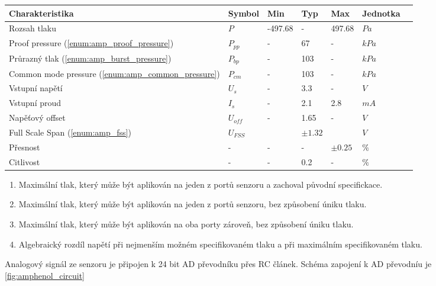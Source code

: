 \begin{center}
	\begin{tabular}{lllllll}
	\toprule
	Charakteristika                        & Symbol   & Min & Typ & Max   & Jednotka &  \\ \midrule
	Rozsah tlaku                           & $P$      &  -497.68  &   -   &  497.68  & $Pa$ & \\
	Proof pressure (\ref{enum:amp_proof_pressure})                      & $P_{pp}$ &  -  &   67   &  -  & $kPa$ & \\
	Průrazný tlak (\ref{enum:amp_burst_pressure})                       & $P_{bp}$ &  -  &   103   &  -  & $kPa$ & \\
	Common mode pressure (\ref{enum:amp_common_pressure})                & $P_{cm}$ &  -  &   103   &  -  & $kPa$ & \\
	Vstupní napětí                         & $U_{s}$  &  -  & 3.3  &  -  & $V$ &  \\
	Vstupní proud                          & $I_{s}$  &  -  & 2.1  &  2.8  & $mA$ &  \\
	Napěťový offset						   & $U_{off}$&  -  & 1.65 & -  & $V$ &  \\ 
	Full Scale Span (\ref{enum:amp_fss})                    & $U_{FSS}$&     &$\pm 1.32$& & $V$ & \\
	Přesnost							   & - 		  &  -  & - & $\pm 0.25 $  &  $\%$ &\\
	Citlivost                              & - & - & 0.2 & - & $\%$ & \\
	\bottomrule
\end{tabular}    
\end{center}
\raggedbottom		
\begin{enumerate}
		\item \label{enum:amp_proof_pressure} Maximální tlak, který může být aplikován na jeden z portů senzoru a zachoval původní specifickace.
		\item \label{enum:amp_burst_pressure} Maximální tlak, který může být aplikován na jeden z portů senzoru, bez způsobení úniku tlaku.
		\item \label{enum:amp_common_pressure} Maximální tlak, který může být aplikován na oba porty zároveň, bez způsobení úniku tlaku.
		\item \label{enum:amp_fss} Algebraický rozdíl napětí při nejmenším možném specifikovaném tlaku a při maximálním specifikovaném tlaku.
\end{enumerate}

Analogový signál ze senzoru je připojen k 24 bit AD převodníku přes RC článek. Schéma zapojení k AD převodníu je \ref{fig:amphenol_circuit}



